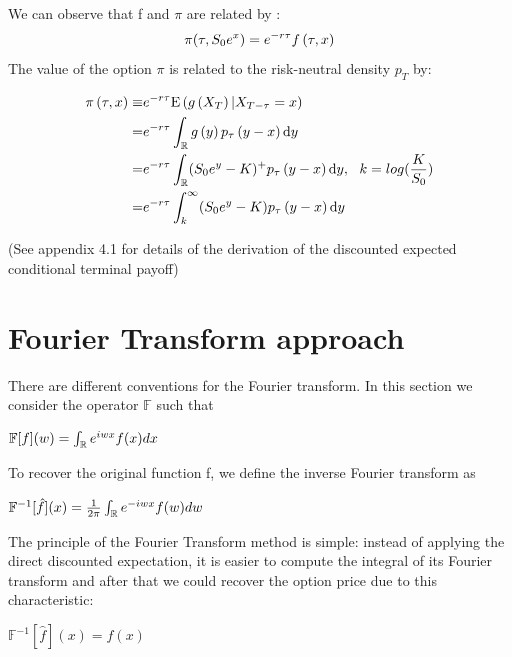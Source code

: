 \documentclass[12pt]{report}
\begin{document}
We can observe that f and $ \pi$ are related by :
\begin{gather}
\pi(\tau,S_0 e^x)= e^{-r\tau}f \left( {\tau,x} \right)
\end{gather}
The value of the option $\pi$ is related to the risk-neutral density $p_T$ by:


\begin{align}
\begin{split}
\pi\left( {\tau,x} \right) \equiv & e^{-r\tau}\mathrm{E} \left( {{g \left( {X_T} \right)|X_{T-\tau} = x}} \right)
\\
= &e^{-r\tau}\int_{\mathbb{R}} g\left( {y} \right)  p_\tau \left( {y-x} \right)  \textrm{d} y
\\
=& e^{-r\tau}\int_{\mathbb{R}} (S_0 e^y-K)^+ p_\tau \left( {y-x} \right)  \textrm{d} y, ~~k=log (\frac{K}{S_0})\\
=& e^{-r\tau} \int_k^\infty (S_0 e^y-K) p_\tau \left( {y-x} \right) \textrm{d} y
\label{moneq}
\end{split}
\end{align}

(See appendix 4.1 for details of the derivation of the discounted expected conditional terminal payoff) 

\section{Fourier Transform approach}

There are different conventions for the Fourier transform. In this section we consider the operator
$\mathbb{F}$ such that

\begin{center}

$\mathbb{F}[f](w)= \int_{\mathbb{R}} e^{iwx}f(x) dx $
\end{center}
To recover the original function f, we define the inverse Fourier transform as

\begin{center}
$\mathbb{F}^{-1}[\hat{f}] (x) =\frac{1}{2\pi}\int_{\mathbb{R}} e^{-iwx}f(w) dw $
\end{center}


The principle of the Fourier Transform method is simple: instead of applying the direct discounted expectation, it is easier to compute the integral of its Fourier transform and after that we could recover the option price due to this characteristic:
\begin{center}
$\mathbb{F}^{-1}[\hat{f}] (x)=f(x)$

\end{center} 
\end{document}
